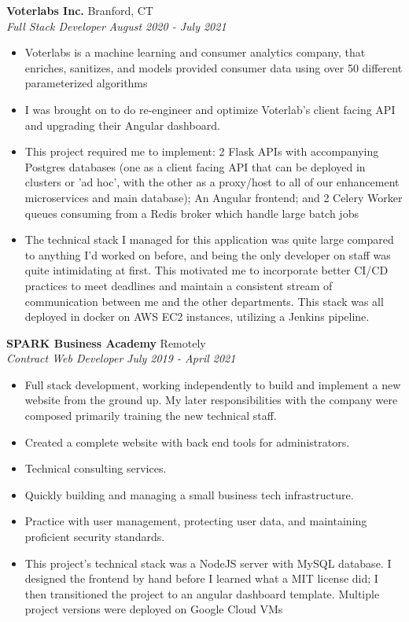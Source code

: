 \documentclass[letterpaper,11pt]{article}
\newcommand{\resumeItem}[2]{
    \item\small{
        \textbf{#1}{#2 \vspace{-2pt}}
    }
}
\newcommand{\resumeSubheading}[4]{
    \vspace{-1pt}
        \item \textbf{#1} \hfill #2 \\
        \textit{\small#3} \hfill \textit{\small #4} \\
    \vspace{-8pt}
}
\newcommand{\resumeItemListStart}{\begin{itemize}}
\newcommand{\resumeItemListEnd}{\end{itemize}\vspace{0pt}}
\begin{document}
    \resumeSubheading
        {Voterlabs Inc.}{Branford, CT}
        {Full Stack Developer}{August 2020 - July 2021}
        \resumeItemListStart
            \resumeItem{}
                {Voterlabs is a machine learning and consumer analytics company, that enriches, sanitizes, and models provided consumer data using over 50 different parameterized algorithms}
            \resumeItem{}
                {I was brought on to do re-engineer and optimize Voterlab's client facing API and upgrading their Angular dashboard.}
            \resumeItem{}
                {This project required me to implement: 2 Flask APIs with accompanying Postgres databases (one as a client facing API that can be deployed in clusters or 'ad hoc', with the other as a proxy/host to all of our enhancement microservices and main database); An Angular frontend; and 2 Celery Worker queues consuming from a Redis broker which handle large batch jobs}
            \resumeItem{}
                {The technical stack I managed for this application was quite large compared to anything I'd worked on before, and being the only developer on staff was quite intimidating at first. This motivated me to incorporate better CI/CD practices to meet deadlines and maintain a consistent stream of communication between me and the other departments. This stack was all deployed in docker on AWS EC2 instances, utilizing a Jenkins pipeline.}
        \resumeItemListEnd

    \clearpage

    \resumeSubheading
        {SPARK Business Academy}{Remotely}
        {Contract Web Developer}{July 2019 - April 2021}
        \resumeItemListStart
            \resumeItem{}
                {Full stack development, working independently to build and implement a new website from the ground up. My later responsibilities with the company were composed primarily training the new technical staff.}
            \resumeItem{}
                {Created a complete website with back end tools for administrators.}
            \resumeItem{}
                {Technical consulting services.}
            \resumeItem{}
                {Quickly building and managing a small business tech infrastructure.}
            \resumeItem{}
                {Practice with user management, protecting user data, and maintaining proficient security standards.}
            \resumeItem{}
                {This project's technical stack was a NodeJS server with MySQL database. I designed the frontend by hand before I learned what a MIT license did; I then transitioned the project to an angular dashboard template. Multiple project versions were deployed on Google Cloud VMs}
        \resumeItemListEnd
\end{document}
